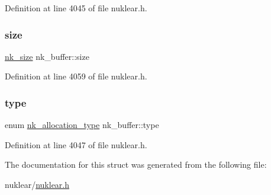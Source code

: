 Definition at line 4045 of file nuklear.\+h.

\mbox{\label{structnk__buffer_a71e66eb6dad2c5827e363f2389ad4505}} 
\subsubsection{\texorpdfstring{size}{size}}
{\footnotesize\ttfamily \mbox{\hyperlink{nuklear_8h_a84c0fc50dec5501be327b33d41d9010c}{nk\+\_\+size}} nk\+\_\+buffer\+::size}



Definition at line 4059 of file nuklear.\+h.

\mbox{\label{structnk__buffer_a3842a03554db557944e84bc5af61249e}} 
\subsubsection{\texorpdfstring{type}{type}}
{\footnotesize\ttfamily enum \mbox{\hyperlink{nuklear_8h_aa988e58afebdfa0bbd380ed643f913ec}{nk\+\_\+allocation\+\_\+type}} nk\+\_\+buffer\+::type}



Definition at line 4047 of file nuklear.\+h.



The documentation for this struct was generated from the following file\+:\begin{DoxyCompactItemize}
\item 
nuklear/\mbox{\hyperlink{nuklear_8h}{nuklear.\+h}}\end{DoxyCompactItemize}
